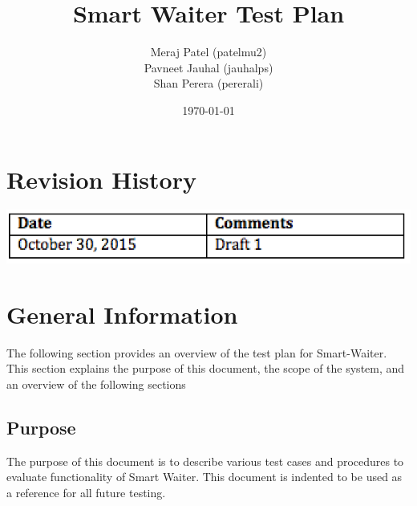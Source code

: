 \documentclass[12pt]{article}
\begin{document}
\title{Smart Waiter Test Plan} 
\author{Meraj Patel (patelmu2) \\ Pavneet Jauhal (jauhalps)\\ Shan Perera (pererali)}
\date{\today}
\maketitle
\pagebreak

\tableofcontents

\listoftables

\section*{Revision History}
\includegraphics[width=\textwidth,height=\textheight,keepaspectratio]{revision.png}



\pagebreak
%
%

\section{General Information}
The following section provides an overview of the test plan 
for Smart-Waiter.
 This section explains the purpose of this document, the scope of the system, and an overview of the following sections

\subsection{Purpose}
The purpose of this document is to describe  various test cases and procedures to evaluate functionality of Smart Waiter.
This document is indented to be used as a reference for all future testing. 
\end{document}
